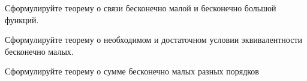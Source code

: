 \begin{question}
  Сформулируйте теорему о связи бесконечно малой и бесконечно большой функций.
\end{question}

\begin{question}
  Сформулируйте теорему о необходимом и достаточном условии эквивалентности бесконечно малых.
\end{question}

\begin{question}
  Сформулируйте теорему о сумме бесконечно малых разных порядков
\end{question}

